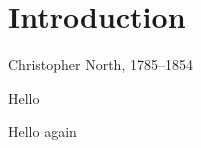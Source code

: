 \chapter{Introduction}
\label{chapter:intro}


%
{Christopher North, 1785--1854}%

Hello


\clearpage

Hello again
